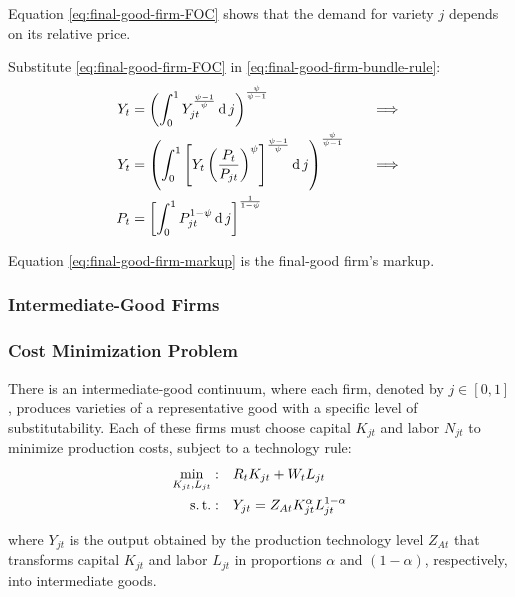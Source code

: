 \documentclass[
thesis.tex
]{subfiles}
\begin{document}
	Equation \ref{eq:final-good-firm-FOC} shows that the demand for variety $j$ depends on its relative price. 
	
	Substitute \ref{eq:final-good-firm-FOC} in \ref{eq:final-good-firm-bundle-rule}:
	\begin{alignat}{2}
		Y_t & = \left( \int_{0}^{1} Y_{jt}^{\frac{\psi-1}{\psi}} \operatorname{d} j \right)^{\frac{\psi}{\psi-1}} &\implies \nonumber \\
		Y_t & = \left( \int_{0}^{1} \left[ Y_t \left( \frac{P_t}{P_{jt}} \right)^{\psi} \right]^{\frac{\psi-1}{\psi}} \operatorname{d} j \right)^{\frac{\psi}{\psi-1}} \quad &\implies \nonumber \\
		P_t & = \left[ \int_{0}^{1} P_{jt}^{1-\psi} \operatorname{d} j \right]^{\frac{1}{1-\psi}} \label{eq:final-good-firm-markup}
	\end{alignat}
	
	Equation \ref{eq:final-good-firm-markup} is the final-good firm's markup.
	
	
	\subsubsection{Intermediate-Good Firms}
	
	\subsubsection*{Cost Minimization Problem}
	
	There is an intermediate-good continuum, where each firm, denoted by $j \in [0,1]$, produces varieties of a representative good with a specific level of substitutability. Each of these firms must choose capital $K_{jt}$ and labor $N_{jt}$ to minimize production costs, subject to a technology rule:
	\begin{align}
		\label{eq:int-good-firm-total-cost}
		\min_{K_{jt}, L_{jt}}: \quad & R_t K_{jt} + W_t L_{jt} \\
		\label{eq:int-good-firm-production-function}
		\operatorname{s.t.}: \quad & Y_{jt} = Z_{At} K_{jt}^\alpha L_{jt}^{1-\alpha}
	\end{align}
	
	where $Y_{jt}$ is the output obtained by the production technology level $Z_{At}$\footnotemark{} that transforms capital $K_{jt}$ and labor $L_{jt}$ in proportions $\alpha$ and $(1-\alpha)$, respectively, into intermediate goods.
	
\end{document}
